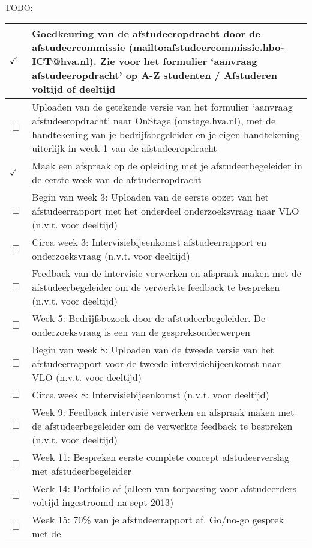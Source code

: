 TODO:
\begin{center}
    \begin{tabular}{ | l | p{15cm} |}
    \hline

    $\checkmark$ & Goedkeuring van de afstudeeropdracht door de
    afstudeercommissie (mailto:afstudeercommissie.hbo-ICT@hva.nl). Zie voor het
    formulier ‘aanvraag afstudeeropdracht’ op A-Z studenten / Afstuderen
    voltijd of deeltijd \\ \hline
    $\Box$ & Uploaden van de getekende versie van het formulier ‘aanvraag
    afstudeeropdracht’ naar OnStage (onstage.hva.nl), met de handtekening van
    je bedrijfsbegeleider en je eigen handtekening uiterlijk in week 1 van de
    afstudeeropdracht \\ \hline
    $\checkmark$ & Maak een afspraak op de opleiding met je afstudeerbegeleider in de eerste week van de afstudeeropdracht \\ \hline
    $\Box$ & Begin van week 3: Uploaden van de eerste opzet van het
    afstudeerrapport met het onderdeel onderzoeksvraag naar VLO (n.v.t. voor
    deeltijd) \\ \hline
    $\Box$ & Circa week 3: Intervisiebijeenkomst afstudeerrapport en
    onderzoeksvraag (n.v.t. voor deeltijd) \\ \hline
    $\Box$ & Feedback van de intervisie verwerken en afspraak maken met de
    afstudeerbegeleider om de verwerkte feedback te bespreken (n.v.t. voor
    deeltijd) \\ \hline
    $\Box$ & Week 5: Bedrijfsbezoek door de afstudeerbegeleider. De
    onderzoeksvraag is een van de gespreksonderwerpen \\ \hline
    $\Box$ & Begin van week 8: Uploaden van de tweede versie van het
    afstudeerrapport voor de tweede intervisiebijeenkomst naar VLO (n.v.t. voor
    deeltijd) \\ \hline
    $\Box$ & Circa week 8: Intervisiebijeenkomst (n.v.t. voor deeltijd) \\
    \hline
    $\Box$ & Week 9: Feedback intervisie verwerken en afspraak maken met de
    afstudeerbegeleider om de verwerkte feedback te bespreken (n.v.t. voor
    deeltijd) \\ \hline
    $\Box$ & Week 11:  Bespreken eerste complete concept afstudeerverslag met
    afstudeerbegeleider \\ \hline
    $\Box$ & Week 14:  Portfolio af (alleen van toepassing voor afstudeerders
    voltijd ingestroomd na sept 2013) \\ \hline
    $\Box$ & Week 15:  70\% van je afstudeerrapport af. Go/no-go gesprek met de

\end{tabular}
\end{center}
